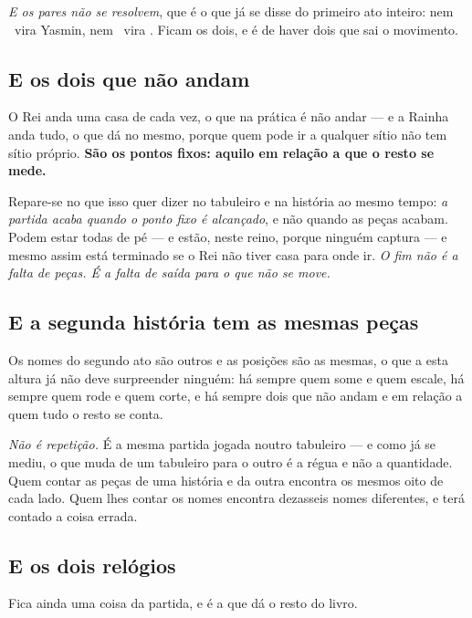 \documentclass[livro.tex]{subfiles}
\begin{document}
\medskip

\emph{E os pares não se resolvem}, que é o que já se disse do primeiro ato inteiro: nem \Joa\ vira
Yasmin, nem \Ben\ vira \Drk. Ficam os dois, e é de haver dois que sai o movimento.

\subsection*{E os dois que não andam}

O Rei anda uma casa de cada vez, o que na prática é não andar --- e a Rainha anda tudo, o que dá no
mesmo, porque quem pode ir a qualquer sítio não tem sítio próprio. \textbf{São os pontos fixos:
aquilo em relação a que o resto se mede.}

\medskip

Repare-se no que isso quer dizer no tabuleiro e na história ao mesmo tempo: \emph{a partida acaba
quando o ponto fixo é alcançado}, e não quando as peças acabam. Podem estar todas de pé --- e
estão, neste reino, porque ninguém captura --- e mesmo assim está terminado se o Rei não tiver casa
para onde ir. \emph{O fim não é a falta de peças. É a falta de saída para o que não se move.}

\subsection*{E a segunda história tem as mesmas peças}

Os nomes do segundo ato são outros e as posições são as mesmas, o que a esta altura já não deve
surpreender ninguém: há sempre quem some e quem escale, há sempre quem rode e quem corte, e há
sempre dois que não andam e em relação a quem tudo o resto se conta.

\medskip

\emph{Não é repetição.} É a mesma partida jogada noutro tabuleiro --- e como já se mediu, o que
muda de um tabuleiro para o outro é a régua e não a quantidade. Quem contar as peças de uma
história e da outra encontra os mesmos oito de cada lado. Quem lhes contar os nomes encontra
dezasseis nomes diferentes, e terá contado a coisa errada.


\subsection*{E os dois relógios}

Fica ainda uma coisa da partida, e é a que dá o resto do livro.

\medskip
\end{document}
